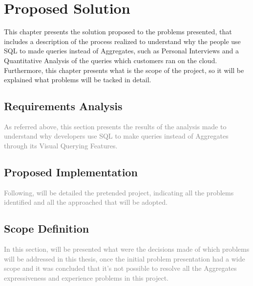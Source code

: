 \chapter{Proposed Solution}
\label{cha:proposed_solution}
This chapter presents the solution proposed to the problems presented, that 
includes a description of the process realized to understand why the people 
use SQL to made queries instead of Aggregates, such as Personal Interviews and 
a Quantitative Analysis of the queries which customers ran on the cloud. 
Furthermore, this chapter presents what is the scope of the project, so it will 
be explained what problems will be tacked in detail.

\section{Requirements Analysis}
\label{sec:requirements_analysis}
\textcolor{gray}{As referred above, this section presents the results of the analysis made to 
understand why developers use SQL to make queries instead of Aggregates through 
its Visual Querying Features.}

\section{Proposed Implementation}
\label{sec:proposed_implementation}
\textcolor{gray}{Following, will be detailed the pretended project, indicating all the problems 
identified and all the approached that will be adopted.}

\section{Scope Definition}
\label{sec:scope_definition}
\textcolor{gray}{In this section, will be presented what were the decisions made of which problems 
will be addressed in this thesis, once the initial problem presentation had a wide 
scope and it was concluded that it's not possible to resolve all the Aggregates 
expressiveness and experience problems in this project.}